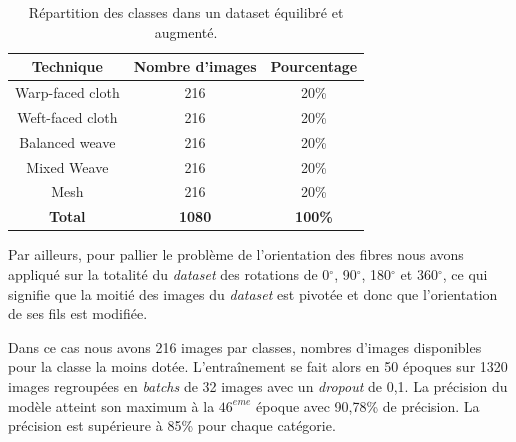 \begin{table}[!h]
    \centering
    \begin{tabular}{|c|c|c|}
        \hline
         \cellcolor{blue!20}\textbf{Technique} & \cellcolor{blue!20}\textbf{Nombre d'images}& \cellcolor{blue!20} \textbf{Pourcentage} \\ \hline \hline
         Warp-faced cloth & 216 & 20\% \\ \hline
         Weft-faced cloth & 216 & 20\% \\ \hline
         Balanced weave & 216 & 20\% \\ \hline
         Mixed Weave & 216 & 20\%  \\ \hline
         Mesh & 216 & 20\%  \\ \hline
         \textbf{Total} & \textbf{1080} &  \textbf{100\%}  \\ \hline
    \end{tabular}
    \caption{Répartition des classes dans un dataset équilibré et augmenté.}
    \label{tab:classes_eq_augment}
\end{table}

\noindent Par ailleurs, pour pallier le problème de l'orientation des fibres nous avons appliqué sur la totalité du \textit{dataset} des rotations de 0$^{\circ}$, 90$^{\circ}$, 180$^{\circ}$ et 360$^{\circ}$, ce qui signifie que la moitié des images du \textit{dataset} est pivotée et donc que l'orientation de ses fils est modifiée.

Dans ce cas nous avons 216 images par classes, nombres d'images disponibles pour la classe la moins dotée. L'entraînement se fait alors en 50 époques sur 1320 images regroupées en \textit{batchs} de 32 images avec un \textit{dropout} de 0,1. La précision du modèle atteint son maximum à la $46^{eme}$ époque avec 90,78\% de précision. La précision est supérieure à 85\% pour chaque catégorie.

